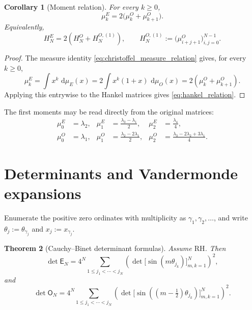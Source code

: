 \documentclass[preprint,12pt]{elsarticle}
\numberwithin{equation}{section}
\theoremstyle{plain}
\newtheorem{theorem}{Theorem}[section]
\newtheorem{corollary}[theorem]{Corollary}
\theoremstyle{definition}
\theoremstyle{remark}
\newcommand{\RH}{\mathrm{RH}}
\newcommand{\E}{\mathsf E}
\newcommand{\Omat}{\mathsf O}
\newcommand{\dd}{\,\mathrm d}
\begin{document}
\begin{corollary}[Moment relation]
\label{cor:moment_relation}
For every $k\ge0$,
\begin{equation}
\mu_k^E=2\bigl(\mu_k^O+\mu_{k+1}^O\bigr).
\label{eq:moment_relation}
\end{equation}
Equivalently,
\begin{equation}
H_N^E=2\left(H_N^O+H_N^{O,(1)}\right),
\qquad
H_N^{O,(1)}:=\bigl(\mu_{i+j+1}^O\bigr)_{i,j=0}^{N-1}.
\label{eq:hankel_relation}
\end{equation}
\end{corollary}

\begin{proof}
The measure identity \eqref{eq:christoffel_measure_relation} gives, for every \(k\ge0\),
\[
\mu_k^E=\int x^k\,\dd\mu_E(x)
=2\int x^k(1+x)\,\dd\mu_O(x)
=2(\mu_k^O+\mu_{k+1}^O).
\]
Applying this entrywise to the Hankel matrices gives \eqref{eq:hankel_relation}.
\end{proof}

The first moments may be read directly from the original matrices:
\begin{align}
\mu_0^E&=\lambda_2,
&\mu_1^E&=\frac{\lambda_3-\lambda_1}{2},
&\mu_2^E&=\frac{\lambda_4}{4},
\label{eq:first_E_moments}\\
\mu_0^O&=\lambda_1,
&\mu_1^O&=\frac{\lambda_2-2\lambda_1}{2},
&\mu_2^O&=\frac{\lambda_3-2\lambda_2+3\lambda_1}{4}.
\label{eq:first_O_moments}
\end{align}

\section{Determinants and Vandermonde expansions}
\label{sec:determinants}

Enumerate the positive zero ordinates with multiplicity as $\gamma_1,\gamma_2,\ldots$, and write $\theta_j:=\theta_{\gamma_j}$ and $x_j:=x_{\gamma_j}$.

\begin{theorem}[Cauchy--Binet determinant formulas]
\label{thm:cauchy_binet_determinants}
Assume $\RH$. Then
\begin{equation}
\det\E_N
=4^N
\sum_{1\le j_1<\cdots<j_N}
\left(\det\bigl[\sin(m\theta_{j_k})\bigr]_{m,k=1}^N\right)^2,
\label{eq:E_cauchy_binet}
\end{equation}
and
\begin{equation}
\det\Omat_N
=4^N
\sum_{1\le j_1<\cdots<j_N}
\left(\det\bigl[\sin((m-\tfrac12)\theta_{j_k})\bigr]_{m,k=1}^N\right)^2.
\label{eq:O_cauchy_binet}
\end{equation}
\end{theorem}
\end{document}
